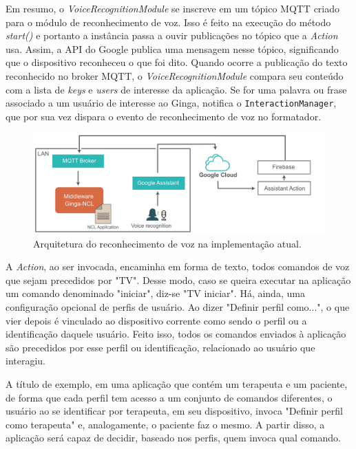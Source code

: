 Em resumo, o \textit{VoiceRecognitionModule} se inscreve em um tópico MQTT criado para o módulo de reconhecimento de voz. Isso é feito na execução do método \textit{start()} e portanto a instância passa a ouvir publicações no tópico que a \textit{Action} usa. Assim, a API do Google publica uma mensagem nesse tópico, significando que o dispositivo reconheceu o que foi dito. Quando ocorre a publicação do texto reconhecido no broker MQTT, o \textit{VoiceRecognitionModule} compara seu conteúdo com a lista de \textit{keys} e \textit{users} de interesse da aplicação. Se for uma palavra ou frase associado a um usuário de interesse ao Ginga, notifica o \texttt{InteractionManager}, que por sua vez dispara o evento de reconhecimento de voz no formatador.

\begin{figure}[h!]
    \centering
    \includegraphics[scale=0.35, keepaspectratio=true]{figuras/arq-action-eng.pdf}
    \caption{Arquitetura do reconhecimento de voz na implementação atual.}
    \label{fig:action}
\end{figure}

A \textit{Action}, ao ser invocada, encaminha em forma de texto, todos comandos de voz que sejam precedidos por "TV". Desse modo, caso se queira executar na aplicação um comando denominado "iniciar", diz-se "TV iniciar". Há, ainda, uma configuração opcional de perfis de usuário. Ao dizer "Definir perfil como...", o que vier depois é vinculado ao dispositivo corrente como sendo o perfil ou a identificação daquele usuário. Feito isso, todos os comandos enviados à aplicação são precedidos por esse perfil ou identificação, relacionado ao usuário que interagiu.

A título de exemplo, em uma aplicação que contém um terapeuta e um paciente, de forma que cada perfil tem acesso a um conjunto de comandos diferentes, o usuário ao se identificar por terapeuta, em seu dispositivo, invoca "Definir perfil como terapeuta" e, analogamente, o paciente faz o mesmo. A partir disso, a aplicação será capaz de decidir, baseado nos perfis, quem invoca qual comando.

